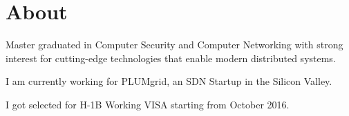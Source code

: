 \documentclass[]{cv}
\begin{document}


\footer{\today}





\section{About}


Master graduated in Computer Security and Computer Networking with
strong interest for cutting-edge technologies that enable modern
distributed systems.

I am currently working for PLUMgrid, an SDN Startup in the Silicon
Valley.

I got selected for H-1B Working VISA starting from October 2016.

\framebreak
\end{document}
